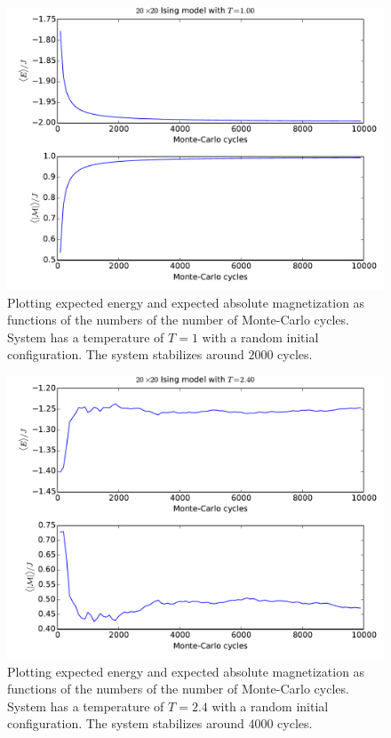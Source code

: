 \begin{figure}
  \centering
  \includegraphics[width=0.8\linewidth]{1_mc_random.pdf}
  \caption{Plotting expected energy and expected absolute magnetization as
  functions of the numbers of the number of Monte-Carlo cycles. System has a
temperature of $T = 1$ with a random initial configuration. The system
stabilizes around $2000$ cycles.}
  \label{fig:1_mc_random}
\end{figure}

\begin{figure}
  \centering
  \includegraphics[width=0.8\linewidth]{2-4_mc_ordered.pdf}
  \caption{Plotting expected energy and expected absolute magnetization as
  functions of the numbers of the number of Monte-Carlo cycles. System has a
temperature of $T = 2.4$ with a random initial configuration. The system
stabilizes around $4000$ cycles.}
  \label{fig:2_mc_ordered}
\end{figure}

